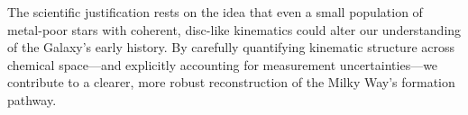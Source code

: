 \documentclass[a4paper,10pt]{article}
\begin{document}
\begin{multicols}{2}
The scientific justification rests on the idea that even a small population of metal-poor stars with coherent, 
disc-like kinematics could alter our understanding of the Galaxy’s early history. By carefully quantifying kinematic 
structure across chemical space—and explicitly accounting for measurement uncertainties—we contribute to a clearer, more 
robust reconstruction of the Milky Way’s formation pathway.




\end{multicols}
\end{document}
